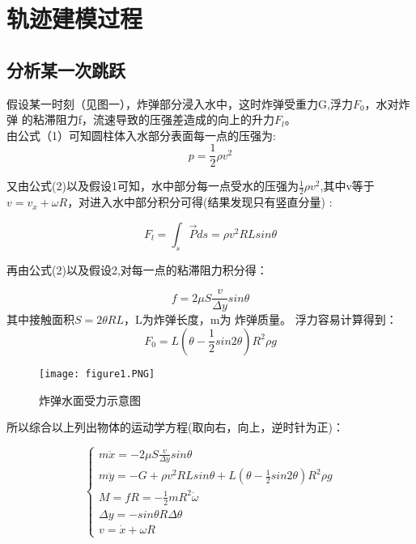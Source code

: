 \documentclass[UTF8]{ctexart}
\begin{document}
 \section{轨迹建模过程}
   \subsection{分析某一次跳跃}
    假设某一时刻（见图一），炸弹部分浸入水中，这时炸弹受重力G,浮力$F_0$，水对炸弹
    的粘滞阻力f，流速导致的压强差造成的向上的升力$F_l$。\\
    由公式（1）可知圆柱体入水部分表面每一点的压强为:
    \begin{equation}
p=\frac{1}{2}\rho{v^2}
    \end{equation}
     
    \indent 又由公式(2)以及假设1可知，水中部分每一点受水的压强为$\frac{1}{2}\rho{v^2}$,其中v等于
    $v={v_x}+\omega{R}$，对进入水中部分积分可得(结果发现只有竖直分量) :

  \begin{equation}
      F_l=\int_{s}\vec{P}ds=\rho{v^2}RLsin\theta
  \end{equation}

  再由公式(2)以及假设2,对每一点的粘滞阻力积分得：

     
  
  \begin{equation}
    f=2\mu{S}\frac{v}{\Delta{y}}sin\theta
\end{equation}
  其中接触面积$S=2\theta{RL}$，L为炸弹长度，m为
  炸弹质量。
浮力容易计算得到：
  \begin{equation}
    F_0=L(\theta-\frac{1}{2}sin2\theta)R^2\rho{g}
\end{equation}
  
  \begin{figure}[t]
    \centering 
    \texttt{[image: figure1.PNG]}    
    \caption{炸弹水面受力示意图}
  \end{figure}




   \indent 所以综合以上列出物体的运动学方程(取向右，向上，逆时针为正)：

   \begin{equation}
    \begin{cases}
      m\ddot{x}=-2\mu{S}\frac{v}{\Delta{y}}sin\theta \\
      m\ddot{y}=-G+\rho{v^2}RLsin\theta+L(\theta-\frac{1}{2}sin2\theta)R^2\rho{g}\\
      M=fR=-\frac{1}{2}mR^2\dot{\omega}\\
      \Delta{y}=-sin\theta{R\Delta{\theta}}\\
      v=\dot{x}+\omega{R}
    \end{cases}
   \end{equation}
\end{document}
